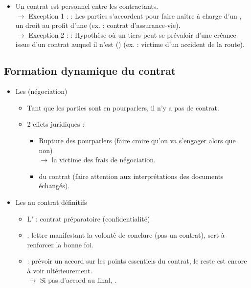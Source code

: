 \begin{itemize}
\begin{itemize}
		\item Un contrat est personnel entre les contractants.\\
		$\rightarrow$ Exception 1 :  : Les parties s'accordent pour faire naitre à charge d'un , un droit au profit d'une  (ex. : contrat d'assurance-vie).\\
		$\rightarrow$ Exception 2 :  : Hypothèse où un tiers peut se prévaloir d'une créance issue d'un contrat auquel il n'est  () (ex. : victime d'un accident de la route).
	\end{itemize}
\end{itemize}

\subsection{Formation dynamique du contrat}

\begin{itemize}
	\item Les  (négociation)
	\begin{itemize}
		\item Tant que les parties sont en pourparlers, il n'y a pas de contrat.
		\item 2 effets juridiques :
		\begin{itemize}
			\item Rupture  des pourparlers (faire croire qu'on va s'engager alors que non)\\
			$\rightarrow$  la victime des frais de négociation.
			\item {} du contrat (faire attention aux interprétations des documents échangés).
		\end{itemize}
	\end{itemize}
	\item Les  au contrat définitifs
	\begin{itemize}
		\item L' : contrat préparatoire (confidentialité)
		\item {} : lettre manifestant la volonté de conclure (pas un contrat), sert à renforcer la bonne foi.
		\item {} : prévoir un accord sur les points essentiels du contrat, le reste est encore à voir ultérieurement.\\
		$\rightarrow$ Si pas d'accord au final, .
	\end{itemize}
\end{itemize}


